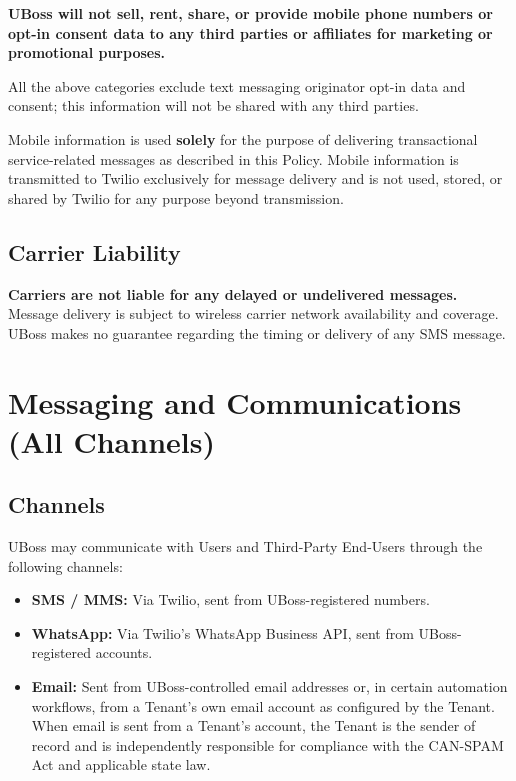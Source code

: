 \documentclass[11pt, letterpaper]{article}
\begin{document}
\begin{tcolorbox}[keywarning, title={CTIA Required Disclosure}]
\textbf{UBoss will not sell, rent, share, or provide mobile phone numbers or opt-in
consent data to any third parties or affiliates for marketing or promotional purposes.}

All the above categories exclude text messaging originator opt-in data and consent;
this information will not be shared with any third parties.
\end{tcolorbox}

Mobile information is used \textbf{solely} for the purpose of delivering transactional
service-related messages as described in this Policy. Mobile information is transmitted
to Twilio exclusively for message delivery and is not used, stored, or shared by Twilio
for any purpose beyond transmission.

\subsection{Carrier Liability}

\textbf{Carriers are not liable for any delayed or undelivered messages.} Message
delivery is subject to wireless carrier network availability and coverage. UBoss makes
no guarantee regarding the timing or delivery of any SMS message.

\section{Messaging and Communications (All Channels)}

\subsection{Channels}

UBoss may communicate with Users and Third-Party End-Users through the following
channels:

\begin{itemize}
    \item \textbf{SMS / MMS:} Via Twilio, sent from UBoss-registered numbers.
    \item \textbf{WhatsApp:} Via Twilio's WhatsApp Business API, sent from
          UBoss-registered accounts.
    \item \textbf{Email:} Sent from UBoss-controlled email addresses or, in certain
          automation workflows, from a Tenant's own email account as configured by the
          Tenant. When email is sent from a Tenant's account, the Tenant is the sender
          of record and is independently responsible for compliance with the CAN-SPAM
          Act and applicable state law.
\end{itemize}
\end{document}
